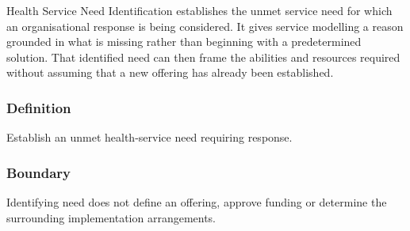 Health Service Need Identification establishes the unmet service need for which an organisational response is being considered. It gives service modelling a reason grounded in what is missing rather than beginning with a predetermined solution. That identified need can then frame the abilities and resources required without assuming that a new offering has already been established.

\subsubsection*{Definition}

Establish an unmet health-service need requiring response.

\subsubsection*{Boundary}

Identifying need does not define an offering, approve funding or determine the surrounding implementation arrangements.

